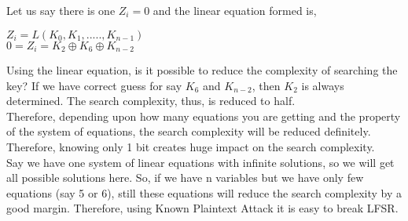 \documentclass[11pt]{article}
\begin{document}
\newline
Let us say there is one $Z_i = 0$ and the linear equation formed is,
\begin{center}
    $Z_i = L(K_0, K_1,....., K_{n-1})$\\
    $0 = Z_i = K_2 \oplus K_6 \oplus K_{n-2}$\\
\end{center}
Using the linear equation, is it possible to reduce the complexity of searching the key? If we have correct guess for say $K_6$ and $K_{n-2}$, then $K_2$ is always determined. The search complexity, thus, is reduced to half.\\
Therefore, depending upon how many equations you are getting and the property of the system of equations, the search complexity will be reduced definitely. Therefore, knowing only 1 bit creates huge impact on the search complexity.\\
Say we have one system of linear equations with infinite solutions, so we will get all possible solutions here. So, if we have n variables but we have only few equations (say 5 or 6), still these equations will reduce the search complexity by a good margin. Therefore, using Known Plaintext Attack it is easy to break LFSR.\\
\end{document}
